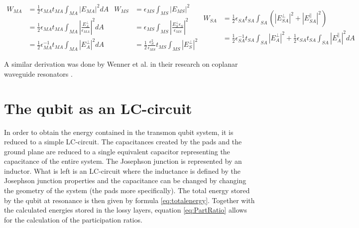 \begin{subequations}\label{eq:LossyLayerEnergy}
	\begin{equation} \label{eq:LossyLayerEnergyA}
		\begin{aligned}
			W_{MA} &=\frac{1}{2}\epsilon_{MA}t_{MA}\int_{MA}^{}|E_{MA}|^{2}dA \\
				   &=\frac{1}{2}\epsilon_{MA}t_{MA}\int_{MA}^{}|\frac{E_{A}^{\bot}}{\epsilon_{MA}}|^{2}dA \\
				   &=\frac{1}{2}\epsilon_{MA}^{-1}t_{MA}\int_{MA}^{}|E_{A}^{\bot}|^{2}dA
		\end{aligned}
	\end{equation}	
	\begin{equation} \label{eq:LossyLayerEnergyB}
		\begin{aligned}
			W_{MS} &=\epsilon_{MS}\int_{MS}^{}|E_{MS}|^{2} \\
			&=\epsilon_{MS}\int_{MS}^{}|\frac{E_{S}^{\bot}\epsilon_{S}}{\epsilon_{MS}}|^{2}\\ 
			&=\frac{1}{2}\frac{\epsilon_{S}^{2}}{\epsilon_{MS}}t_{MS}\int_{MS}^{}|E_{S}^{\bot}|^{2} 
		\end{aligned}
	\end{equation}
	\begin{equation}\label{eq:LossyLayerEnergyC}
		\begin{aligned}
			W_{SA} &=\frac{1}{2}\epsilon_{SA}^{}t_{SA}\int_{SA}^{}(|E_{SA}^{\bot}|^{2} + |E_{SA}^{\parallel}|^{2})\\
			&=\frac{1}{2}\epsilon_{SA}^{-1}t_{SA}\int_{SA}^{}|E_{A}^{\bot}|^{2} +\frac{1}{2} \epsilon_{SA}t_{SA}\int_{SA}^{}|E_{A}^{\parallel}|^{2}dA
		\end{aligned}
	\end{equation}
\end{subequations}

A similar derivation was done by Wenner et al. in their research on coplanar waveguide resonators \cite{Wenner2011}. 

\section{The qubit as an LC-circuit}
In order to obtain the energy contained in the transmon qubit system, it is reduced to a simple LC-circuit. The capacitances created by the pads and the ground plane are reduced to a single equivalent capacitor representing the capacitance of the entire system. The Josephson junction is represented by an inductor. What is left is an LC-circuit where the inductance is defined by the Josephson junction properties and the capacitance can be changed by changing the geometry of the system (the pads more specifically). The total energy stored by the qubit at resonance is then given by formula \eqref{eq:totalenergy}. Together with the calculated energies stored in the lossy layers, equation \eqref{eq:PartRatio} allows for the calculation of the participation ratios.

